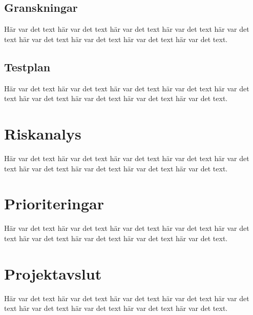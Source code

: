 \documentclass[a4paper,titlepage,12pt]{article}
\begin{document}
	
	\subsection{Granskningar}
	Här var det text här var det text här var det text
	här var det text här var det text här var det text
	här var det text här var det text här var det text.
	
	
	\subsection{Testplan}
	Här var det text här var det text här var det text
	här var det text här var det text här var det text
	här var det text här var det text här var det text.
	
	
	\section{Riskanalys}
	Här var det text här var det text här var det text
	här var det text här var det text här var det text
	här var det text här var det text här var det text.
	
	
	\section{Prioriteringar}
	Här var det text här var det text här var det text
	här var det text här var det text här var det text
	här var det text här var det text här var det text.
	
	
	\section{Projektavslut}
	Här var det text här var det text här var det text
	här var det text här var det text här var det text
	här var det text här var det text här var det text.
\end{document}

